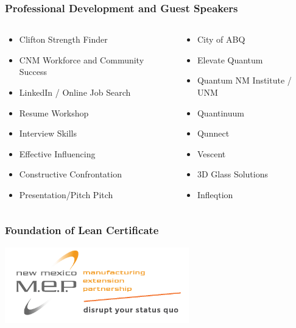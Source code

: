 \documentclass{beamer}
\begin{document}
\begin{frame}\frametitle{Professional Development and Guest Speakers}
\begin{columns}
\begin{column}{5.5cm}
\begin{itemize}
\item Clifton Strength Finder
\item CNM Workforce and Community Success
\item LinkedIn / Online Job Search
\item Resume Workshop
\item Interview Skills
\item Effective Influencing
\item Constructive Confrontation
\item Presentation/Pitch Pitch
\end{itemize}
\end{column}
\begin{column}{5.5cm}
\begin{itemize}
\item City of ABQ
\item Elevate Quantum
\item Quantum NM Institute / UNM
\item Quantinuum
\item Qunnect
\item Vescent
\item 3D Glass Solutions
\item Infleqtion
\end{itemize}
\end{column}
\end{columns}
\end{frame}



\begin{frame}\frametitle{Foundation of Lean Certificate}
\begin{center}
\includegraphics[width=8cm]{fig/nmmep.png} 
\end{center}
\end{frame}
\end{document}

